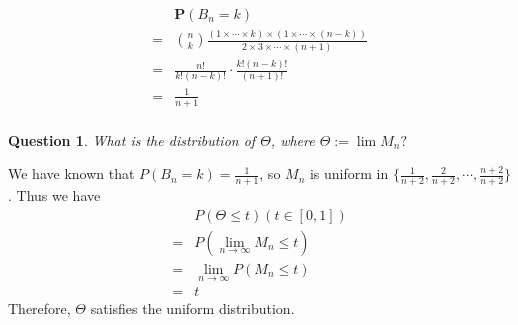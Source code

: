 \documentclass{article}
\newtheorem{question}[theorem]{Question}
\begin{document}
\begin{solution}

\begin{equation*}
    \begin{array}{cc}
        & \mathbf{P}(B_n=k)\\
        = &{n \choose k} \frac{(1\times\cdots\times k)\times(1\times\cdots\times(n-k))}{2\times3\times\cdots\times(n+1)}\\
        = &\frac{n!}{k!(n-k)!} \cdot\frac{k!(n-k)!}{(n+1)!}\\
        = & \frac{1}{n+1}\\
    \end{array}
\end{equation*}
\end{solution}

\begin{question}
What is the distribution of $\Theta$, where
$\Theta:=\lim M_{n} ?$
\end{question}

\begin{solution}
We have known that $P(B_n=k)=\frac{1}{n+1}$, so $M_n$ is uniform in $\{\frac{1}{n+2},\frac{2}{n+2},\cdots,\frac{n+2}{n+2}\}$. Thus we have
\begin{equation*}
    \begin{array}{rl}
         & P(\Theta\le t) (t\in[0,1])\\
       = & P(\lim_{n\rightarrow\infty}M_n \le t) \\
       = & \lim_{n\rightarrow\infty}P(M_n \le t) \\
       = & t
    \end{array}
\end{equation*}
Therefore, $\Theta$ satisfies the uniform distribution.
\end{solution}
\end{document}
